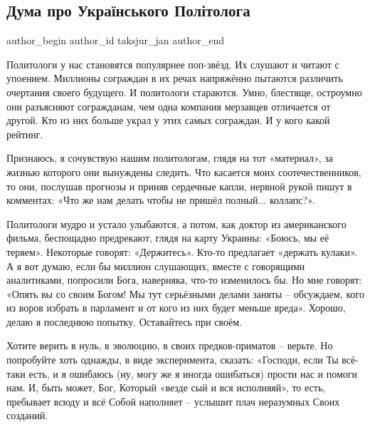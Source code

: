  
 
 
 
 
 
\subsection{Дума про Українського Політолога}
\label{sec:19_05_2021.fb.taksjur_jan.1.duma_ukr_politolog}
\ifcmt
 author_begin
   author_id taksjur_jan
 author_end
\fi

Политологи у нас становятся популярнее поп-звёзд. Их слушают и читают с
упоением. Миллионы сограждан в их речах напряжённо пытаются различить очертания
своего будущего. И политологи стараются. Умно, блестяще, остроумно они
разъясняют согражданам, чем одна компания мерзавцев отличается от другой. Кто
из них больше украл у этих самых сограждан. И у кого какой рейтинг. 

Признаюсь, я сочувствую нашим политологам, глядя на тот «материал», за жизнью
которого они вынуждены следить. Что касается моих соотечественников, то они,
послушав прогнозы и приняв сердечные капли, нервной рукой пишут в комментах:
«Что же нам делать чтобы не пришёл полный... коллапс?».

Политологи мудро и устало улыбаются, а потом, как доктор из американского
фильма, беспощадно предрекают, глядя на карту Украины: «Боюсь, мы её теряем».
Некоторые говорят: «Держитесь». Кто-то предлагает «держать кулаки». А я вот
думаю, если бы миллион слушающих, вместе с говорящими аналитиками, попросили
Бога, наверняка, что-то изменилось бы. Но мне говорят: «Опять вы со своим
Богом! Мы тут серьёзными делами заняты – обсуждаем, кого из воров избрать в
парламент и от кого из них будет меньше вреда». Хорошо, делаю я последнюю
попытку. Оставайтесь при своём. 

Хотите верить в нуль, в эволюцию, в своих предков-приматов – верьте. Но
попробуйте хоть однажды, в виде эксперимента, сказать: «Господи, если Ты
всё-таки есть, и я ошибаюсь (ну, могу же я иногда ошибаться) прости нас и
помоги нам. И, быть может, Бог, Который «везде сый и вся исполняяй», то есть,
пребывает всюду и всё Собой наполняет – услышит плач неразумных Своих созданий.

